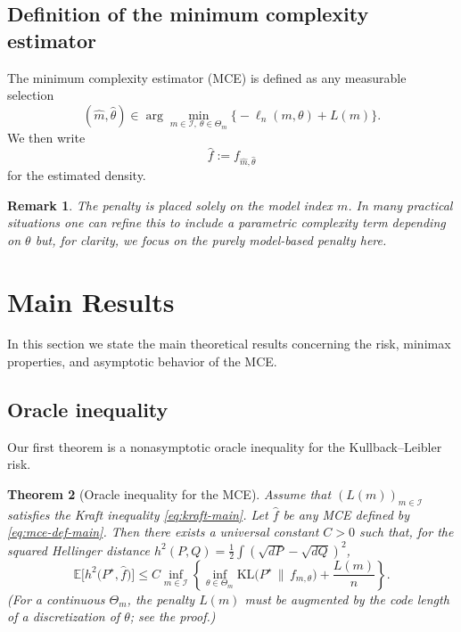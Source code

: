 \documentclass[12pt]{article}
\newtheorem{theorem}{Theorem}[section]
\newtheorem{remark}[theorem]{Remark}
\numberwithin{equation}{section}
\begin{document}
	\subsection{Definition of the minimum complexity estimator}
	
	The minimum complexity estimator (MCE) is defined as any measurable
	selection
	\begin{equation}
		\label{eq:mce-def-main}
		(\widehat{m},\widehat{\theta})
		\in \arg\min_{m\in\mathcal{I},\ \theta\in\Theta_m}
		\Big\{
		-\ell_n(m,\theta)
		+ L(m)
		\Big\}.
	\end{equation}
	We then write
	\[
	\widehat{f} := f_{\widehat{m},\widehat{\theta}}
	\]
	for the estimated density.
	
	\begin{remark}
		The penalty is placed solely on the model index $m$. In many practical
		situations one can refine this to include a parametric complexity term
		depending on $\theta$ but, for clarity, we focus on the purely
		model-based penalty here.
	\end{remark}
	
	\section{Main Results}
	\label{sec:main-results}
	
	In this section we state the main theoretical results concerning the
	risk, minimax properties, and asymptotic behavior of the MCE.
	
	\subsection{Oracle inequality}
	
	Our first theorem is a nonasymptotic oracle inequality for the
	Kullback--Leibler risk.
	
	\begin{theorem}[Oracle inequality for the MCE]
		\label{thm:oracle}
		Assume that $(L(m))_{m\in\mathcal{I}}$ satisfies the Kraft inequality
		\eqref{eq:kraft-main}. Let $\widehat{f}$ be any MCE defined by
		\eqref{eq:mce-def-main}. Then there exists a universal constant $C>0$
		such that, for the squared Hellinger distance
		$h^2(P,Q)=\tfrac12\int(\sqrt{dP}-\sqrt{dQ})^2$,
		\begin{equation}
			\label{eq:oracle-statement}
			\mathbb{E}\Big[
			h^2\!\big(P^{\star},\widehat{f}\big)
			\Big]
			\le C \inf_{m\in\mathcal{I}}
			\left\{
			\inf_{\theta\in\Theta_m}
			\mathrm{KL}\!\big(P^{\star}\,\|\,f_{m,\theta}\big)
			+ \frac{L(m)}{n}
			\right\}.
		\end{equation}
		(For a continuous $\Theta_m$, the penalty $L(m)$ must be augmented by the
		code length of a discretization of $\theta$; see the proof.)
	\end{theorem}
	
\end{document}
